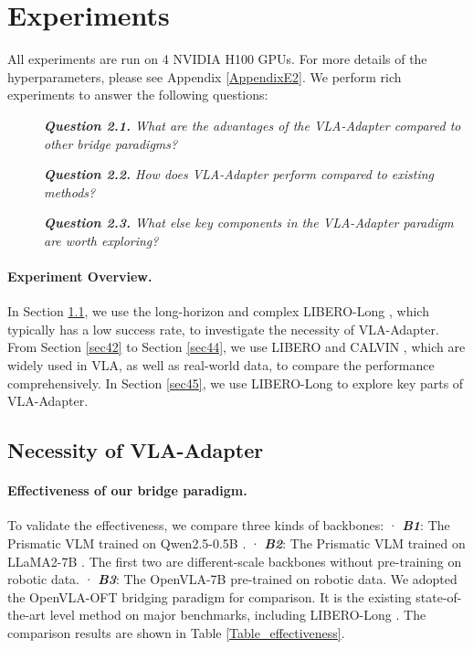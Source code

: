 \section{Experiments}\label{Section_experiments}

All experiments are run on 4 NVIDIA H100 GPUs. For more details of the hyperparameters, please see Appendix \ref{AppendixE2}. We perform rich experiments to answer the following questions:

\begin{description}
	\item[] \thinspace \textit{\textbf{Question 2.1.} What are the advantages of the VLA-Adapter compared to other bridge paradigms?}
	\item[] \thinspace \textit{\textbf{Question 2.2.} How does VLA-Adapter perform compared to existing methods?}
	\item[] \thinspace \textit{\textbf{Question 2.3.} What else key components in the VLA-Adapter paradigm are worth exploring?}
\end{description}

\paragraph{Experiment Overview.} In Section \ref{sec41}, we use the long-horizon and complex LIBERO-Long \citep{LIBERO-2023}, which typically has a low success rate, to investigate the necessity of VLA-Adapter. From Section \ref{sec42} to Section \ref{sec44}, we use LIBERO \citep{LIBERO-2023} and CALVIN \citep{CALVIN-2022}, which are widely used in VLA, as well as real-world data, to compare the performance comprehensively. In Section \ref{sec45}, we use LIBERO-Long to explore key parts of VLA-Adapter.

\subsection{Necessity of VLA-Adapter}\label{sec41}

\paragraph{Effectiveness of our bridge paradigm.} To validate the effectiveness, we compare three kinds of backbones: · \textit{\textbf{B1}}: The Prismatic VLM \citep{Prismatic-2024} trained on Qwen2.5-0.5B \citep{Qwen2-2024}. · \textit{\textbf{B2}}: The Prismatic VLM trained on LLaMA2-7B \citep{LLaMA2-2023}. The first two are different-scale backbones without pre-training on robotic data. · \textit{\textbf{B3}}: The OpenVLA-7B \citep{OpenVLA-2024} pre-trained on robotic data. We adopted the OpenVLA-OFT bridging paradigm \citep{OpenVLA-OFT-2025} for comparison. It is the existing state-of-the-art level method on major benchmarks, including LIBERO-Long \citep{LIBERO-2023}. The comparison results are shown in Table \ref{Table_effectiveness}.

